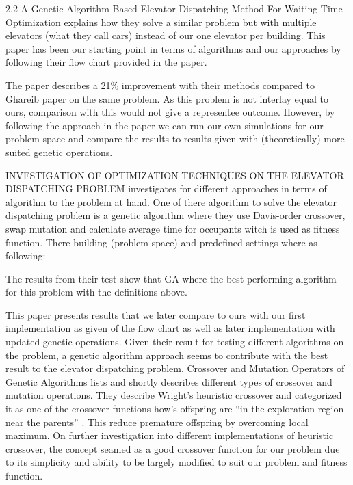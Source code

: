 
2.2
A Genetic Algorithm Based Elevator Dispatching Method For Waiting Time Optimization \cite{tartan2016genetic} explains how they solve a similar problem but with multiple elevators (what they call cars) instead of our one elevator per building. This paper has been our starting point in terms of algorithms and our approaches by following their flow chart provided in the paper.

The paper describes a 21\% improvement with their methods compared to Ghareib paper \cite{gharieb2005optimal} on the same problem. As this problem is not interlay equal to ours, comparison with this would not give a representee outcome. However, by following the approach in the paper we can run our own simulations for our problem space and compare the results to results given with (theoretically) more suited genetic operations.

INVESTIGATION OF OPTIMIZATION TECHNIQUES ON THE ELEVATOR DISPATCHING PROBLEM \cite{ahmed2022investigation} investigates for different approaches in terms of algorithm to the problem at hand.  One of there algorithm to solve the elevator dispatching problem is a genetic algorithm where they use Davis-order crossover, swap mutation and calculate average time for occupants  witch is used as fitness function. There building (problem space) and predefined settings where as following:

The results from their test show that GA where the best performing algorithm for this problem with the definitions above.

This paper presents results that we later compare to ours with our first implementation as given of the flow chart\cite{tartan2016genetic} as well as later implementation with updated genetic operations. Given their result for testing different algorithms on the problem, a genetic algorithm approach seems to contribute with the best result to the elevator dispatching problem.
Crossover and Mutation Operators of Genetic Algorithms \cite{ahmed2022investigation} lists and shortly describes different types of crossover and mutation operations. They describe Wright's heuristic crossover and categorized it as one of the crossover functions how’s offspring are “in the exploration region near the parents” \cite{ahmed2022investigation}. This reduce premature offspring by overcoming local maximum. On further investigation into different implementations of heuristic crossover, the concept seamed as a good crossover function for our problem due to its simplicity and ability to be largely modified to suit our problem and fitness function.


